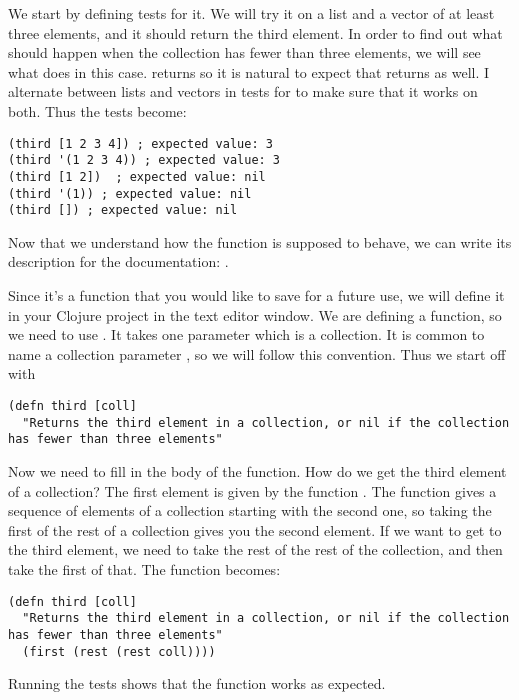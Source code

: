 We start by defining tests for it.  
We will try it on a list and a vector of at least three elements, and it should return the third element. 
In order to find out what should happen when the collection has fewer than three elements, we will see what  does in this case.  returns  so it is natural to expect that  returns  as well. I alternate between lists and vectors in tests for  to make sure that it works on both. Thus the tests become:
\begin{framed}
\begin{verbatim}
(third [1 2 3 4]) ; expected value: 3
(third '(1 2 3 4)) ; expected value: 3
(third [1 2])  ; expected value: nil
(third '(1)) ; expected value: nil
(third []) ; expected value: nil
\end{verbatim}
\end{framed}
Now that we understand how the function is supposed to behave, we can write its description for the documentation: . 

Since it's a function that you would like to save for a future use, we will define it in your Clojure project in the text editor window.  
We are defining a function, so we need to use . It takes one parameter which is a collection. It is common to name a collection parameter , so we will follow this convention. Thus we start off with
\begin{framed}
\begin{verbatim}
(defn third [coll]
  "Returns the third element in a collection, or nil if the collection has fewer than three elements"
\end{verbatim}
\end{framed}
Now we need to fill in the body of the function. How do we get the third element of a collection? The first element is given by the function . The function  gives a sequence of elements of a collection starting with the second one, so taking the first of the rest of a collection gives you the second element. If we want to get to the third element, we need to take the rest of the rest of the collection, and then take the first of that. The function becomes:
\begin{framed}
\begin{verbatim}
(defn third [coll]
  "Returns the third element in a collection, or nil if the collection has fewer than three elements"
  (first (rest (rest coll))))
\end{verbatim}
\end{framed}
Running the tests shows that the function works as expected. 

